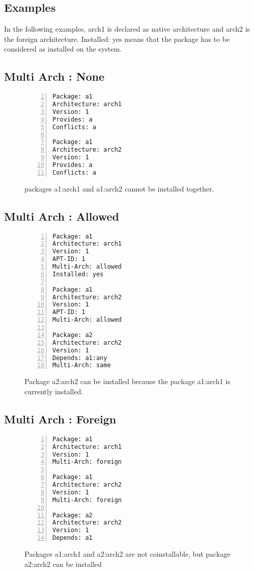 \subsection{Examples}

In the following examples, arch1 is declared as native architecture
and arch2 is the foreign architecture. Installed: yes means that the
package has to be considered as installed on the system.

\subsection{Multi Arch : None}

\begin{figure}
\begin{lstlisting}[style=debctrl,numbers=left,xleftmargin=20pt,basicstyle=\footnotesize\normalfont\ttfamily]
Package: a1
Architecture: arch1
Version: 1
Provides: a
Conflicts: a

Package: a1
Architecture: arch2
Version: 1
Provides: a
Conflicts: a
\end{lstlisting}
\caption{packages a1:arch1 and a1:arch2 cannot be installed together.}
\label{fig:arch-none}
\end{figure}

\subsection{Multi Arch : Allowed}

\begin{figure}
\begin{lstlisting}[style=debctrl,numbers=left,xleftmargin=20pt,basicstyle=\footnotesize\normalfont\ttfamily]
Package: a1
Architecture: arch1
Version: 1
APT-ID: 1
Multi-Arch: allowed
Installed: yes

Package: a1
Architecture: arch2
Version: 1
APT-ID: 1
Multi-Arch: allowed

Package: a2
Architecture: arch2
Version: 1
Depends: a1:any
Multi-Arch: same
\end{lstlisting}
\caption{Package a2:arch2 can be installed because the package a1:arch1
is currently installed.}
\label{fig:arch-allowed}
\end{figure}

\subsection{Multi Arch : Foreign}

\begin{figure}
\begin{lstlisting}[style=debctrl,numbers=left,xleftmargin=20pt,basicstyle=\footnotesize\normalfont\ttfamily]
Package: a1
Architecture: arch1
Version: 1
Multi-Arch: foreign

Package: a1
Architecture: arch2
Version: 1
Multi-Arch: foreign

Package: a2
Architecture: arch2
Version: 1
Depends: a1
\end{lstlisting}
\caption{Packages a1:arch1 and a2:arch2 are not coinstallable, but
package a2:arch2 can be installed}
\label{fig:arch-foreign}
\end{figure}



